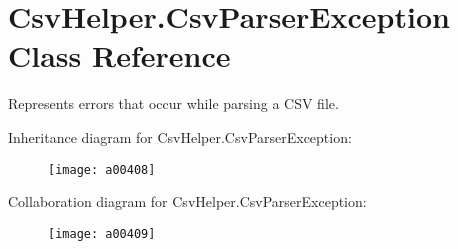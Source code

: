 \hypertarget{a00068}{\section{Csv\-Helper.\-Csv\-Parser\-Exception Class Reference}
\label{a00068}
}


Represents errors that occur while parsing a C\-S\-V file.  




Inheritance diagram for Csv\-Helper.\-Csv\-Parser\-Exception\-:
\nopagebreak
\begin{figure}[H]
\begin{center}
\leavevmode
\texttt{[image: a00408]}
\end{center}
\end{figure}


Collaboration diagram for Csv\-Helper.\-Csv\-Parser\-Exception\-:
\nopagebreak
\begin{figure}[H]
\begin{center}
\leavevmode
\texttt{[image: a00409]}
\end{center}
\end{figure}
